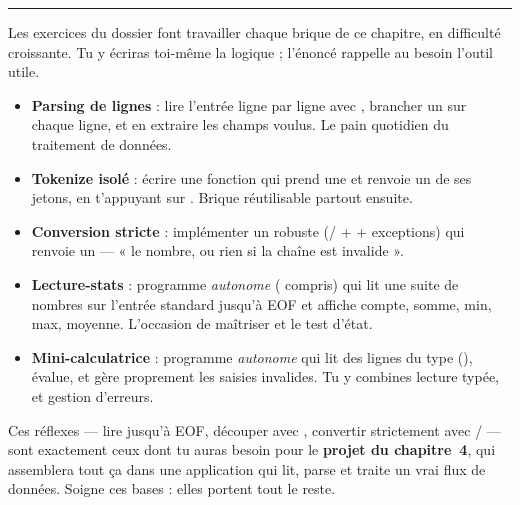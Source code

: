 \documentclass[11pt]{article}
\begin{document}
\bigskip\hrule\bigskip
\noindent Les exercices du dossier  font travailler chaque
brique de ce chapitre, en difficulté croissante. Tu y écriras toi-même la
logique ; l'énoncé rappelle au besoin l'outil utile.

\begin{itemize}[noitemsep]
    \item \textbf{Parsing de lignes} : lire l'entrée ligne par ligne avec
          , brancher un  sur chaque ligne, et
          en extraire les champs voulus. Le pain quotidien du traitement de
          données.
    \item \textbf{Tokenize isolé} : écrire une fonction qui prend une
           et renvoie un  de ses
          jetons, en t'appuyant sur . Brique réutilisable
          partout ensuite.
    \item \textbf{Conversion stricte} : implémenter un  robuste
          (/ +  + exceptions) qui renvoie un
           — « le nombre, ou rien si la chaîne est invalide ».
    \item \textbf{Lecture-stats} : programme \emph{autonome} (
          compris) qui lit une suite de nombres sur l'entrée standard jusqu'à
          EOF et affiche compte, somme, min, max, moyenne. L'occasion de maîtriser
           et le test d'état.
    \item \textbf{Mini-calculatrice} : programme \emph{autonome} qui lit des
          lignes du type  (), évalue, et
          gère proprement les saisies invalides. Tu y combines lecture typée,
           et gestion d'erreurs.
\end{itemize}

\begin{aretenir}
Ces réflexes — lire jusqu'à EOF, découper avec , convertir
strictement avec / — sont exactement ceux dont tu auras
besoin pour le \textbf{projet du chapitre~4}, qui assemblera tout ça dans une
application qui lit, parse et traite un vrai flux de données. Soigne ces bases :
elles portent tout le reste.
\end{aretenir}
\end{document}
